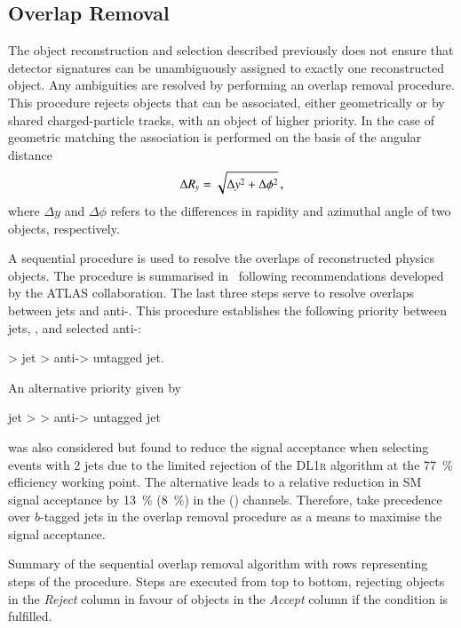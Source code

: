 \subsection{Overlap Removal}%
\label{sec:overlap_removal}

The object reconstruction and selection described previously does not ensure
that detector signatures can be unambiguously assigned to exactly one
reconstructed object. Any ambiguities are resolved by performing an overlap
removal procedure. This procedure rejects objects that can be associated, either
geometrically or by shared charged-particle tracks, with an object of higher
priority. In the case of geometric matching the association is performed on the
basis of the angular distance
\begin{align*}
  \Delta R_y = \sqrt{\Delta y^2 + \Delta \phi^2} \,\text{,}
\end{align*}
where $\Delta y$ and $\Delta \phi$ refers to the differences in rapidity and
azimuthal angle of two objects, respectively.

A sequential procedure is used to resolve the overlaps of reconstructed physics
objects. The procedure is summarised in~ following
recommendations developed by the ATLAS collaboration. The last three steps serve
to resolve overlaps between jets and anti-\tauhadvis. This procedure establishes
the following priority between jets, \tauhadvis, and selected anti-\tauhadvis:
\begin{center}
  \tauhadvis > \btagged jet > anti-\tauhadvis > untagged jet.
\end{center}
An alternative priority given by
\begin{center}
  \btagged jet > \tauhadvis > anti-\tauhadvis > untagged jet
\end{center}
was also considered but found to reduce the signal acceptance when selecting
events with 2 \btagged jets due to the limited \tauhadvis rejection of the
\textsc{DL1r} \btag algorithm at the \SI{77}{\percent} efficiency working
point. The alternative leads to a relative reduction in SM \HH signal acceptance
by \SI{13}{\percent} (\SI{8}{\percent}) in the \hadhad (\lephad)
channels. Therefore, \tauhadvis take precedence over $b$-tagged jets in the
overlap removal procedure as a means to maximise the signal acceptance.

\begin{table}[htbp]
  \centering


  \caption{Summary of the sequential overlap removal algorithm with rows
    representing steps of the procedure. Steps are executed from top to bottom,
    rejecting objects in the \emph{Reject} column in favour of objects in the
    \emph{Accept} column if the condition is fulfilled.}%
  \label{tab:overlap_removal}

  \resizebox{\textwidth}{!}{%
    
  }
\end{table}

